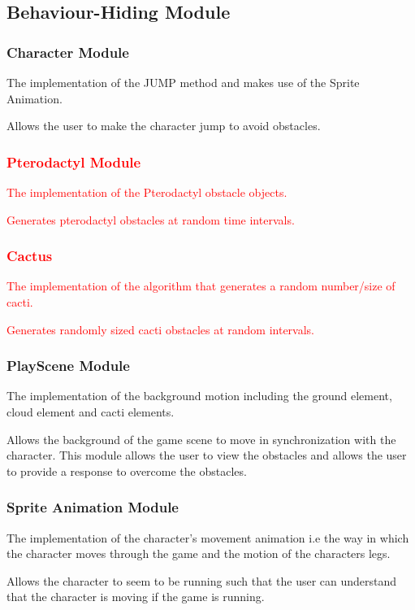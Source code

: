 \documentclass[12pt, titlepage]{article}
\begin{document}
\subsection{Behaviour-Hiding Module}
\begin{description}

\subsubsection{Character Module}
\item[Secrets:] The implementation of the JUMP method and makes use of the Sprite Animation.
\item[Services:] Allows the user to make the character jump to avoid obstacles.


\textcolor{red}{
\subsubsection{Pterodactyl Module}
\item[Secrets:] The implementation of the Pterodactyl obstacle objects.
\item[Services:] Generates pterodactyl obstacles at random time intervals.
\subsubsection{Cactus}
\item[Secrets:] The implementation of the algorithm that generates a random number/size of cacti.
\item[Services:] Generates randomly sized cacti obstacles at random intervals. }

\subsubsection{PlayScene Module}
\item[Secrets:] The implementation of the background motion including the ground element, cloud element and cacti elements.
\item[Services:] Allows the background of the game scene to move in synchronization with the character. This module allows the user to view the obstacles and allows the user to provide a response to overcome the obstacles.

\subsubsection{Sprite Animation Module}
\item[Secrets:] The implementation of the character's movement animation i.e the way in which the character moves through the game and the motion of the characters legs.
\item[Services:] Allows the character to seem to be running such that the user can understand that the character is moving if the game is running.

\end{description}
\end{document}
